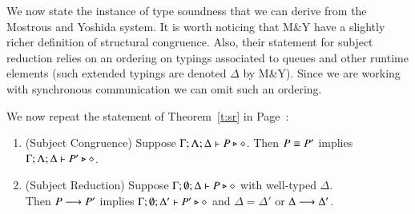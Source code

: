 We now state the instance of type soundness that we
can derive from the Mostrous and Yoshida system.
It is worth noticing that M\&Y have a slightly richer
definition of structural congruence.
Also, their statement for subject reduction relies on an 
ordering on typings associated to queues and other 
runtime elements (such extended typings are denoted $\Delta$ by M\&Y).
Since we are working with synchronous communication we can omit such an ordering.

We now repeat the statement of
Theorem~\ref{t:sr} in Page~\pageref{t:sr}:

\begin{theorem}%
	\begin{enumerate}[1.]
		\item	(Subject Congruence) Suppose $\Gamma; \Lambda; \Delta \vdash P \triangleright \diamond$.
			Then $P \equiv P'$ implies $\Gamma; \Lambda; \Delta \vdash P' \triangleright \diamond$.

		\item	(Subject Reduction) Suppose $\Gamma; \emptyset; \Delta \vdash P \triangleright \diamond$
			with
			well-typed $\Delta$. \\
			Then $P \longrightarrow P'$ implies $\Gamma; \emptyset; \Delta'  \vdash P' \triangleright \diamond$
			and $\Delta = \Delta'$ or $\Delta \longrightarrow \Delta'$.
	\end{enumerate}
\end{theorem}

